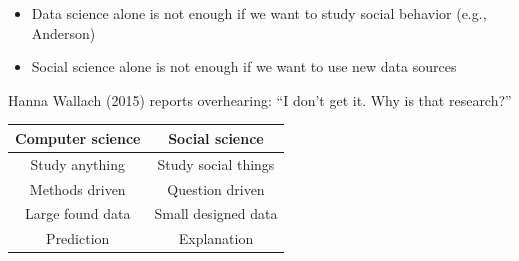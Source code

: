 \documentclass{beamer}
\def\vf{\vfill}
\begin{document}
\begin{frame}

\begin{itemize}
\item Data science alone is not enough if we want to study social behavior (e.g., Anderson)
\pause
\item Social science alone is not enough if we want to use new data sources
\end{itemize}

\end{frame}
\begin{frame}

Hanna Wallach (2015) reports overhearing: ``I don't get it.  Why is that research?''\\
\pause
\vf
\begin{center}
\begin{tabular}{cc}
Computer science & Social science\\
\midrule
Study anything & Study social things\\
Methods driven & Question driven\\
Large found data & Small designed data\\
Prediction & Explanation\\
\end{tabular}
\end{center}

\vf
{}

\end{frame}
\end{document}
